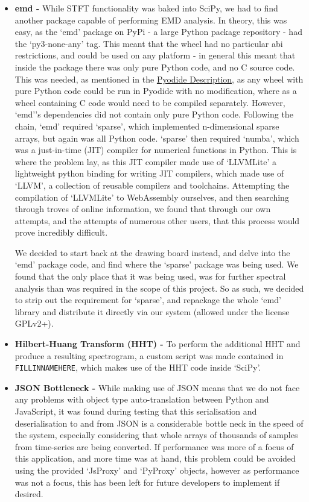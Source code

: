 \begin{itemize}
    \item {\bf emd - } While STFT functionality was baked into SciPy, we had to find another package capable of performing EMD analysis. In theory, this was easy, as the `emd' package on PyPi - a large Python package repository - 
    had the `py3-none-any' tag. This meant that the wheel had no particular abi restrictions, and could be used on any platform - in general this meant that inside the package there was only pure Python code, and no C source code.
    This was needed, as mentioned in the \hyperref[pyodide]{Pyodide Description}, as any wheel with pure Python code could be run in Pyodide with no modification, where as a wheel containing C code would need to be compiled separately.
    However, `emd''s dependencies did not contain only pure Python code. Following the chain, `emd' required `sparse', which implemented n-dimensional sparse arrays, but again was all Python code. `sparse' then required `numba', which was a 
    just-in-time (JIT) compiler for numerical functions in Python. This is where the problem lay, as this JIT compiler made use of `LLVMLite' a lightweight python binding for writing JIT compilers, 
    which made use of `LLVM', a collection of reusable compilers and toolchains. Attempting the compilation of `LLVMLite' to WebAssembly ourselves, and then searching through troves of online information, we found that through our own
    attempts, and the attempts of numerous other users, that this process would prove incredibly difficult.

    We decided to start back at the drawing board instead, and delve into the `emd' package code, and find where the `sparse' package was being used. We found that the only place that it was being used, was for further spectral
    analysis than was required in the scope of this project. So as such, we decided to strip out the requirement for `sparse', and repackage the whole `emd' library and distribute it directly via our
    system (allowed under the license GPLv2+).

    \item {\bf Hilbert-Huang Transform (HHT) - } To perform the additional HHT and produce a resulting spectrogram, a custom script was made contained in \verb|FILLINNAMEHERE|, which makes use of the HHT code inside `SciPy'.

    \item {\bf JSON Bottleneck - } While making use of JSON means that we do not face any problems with object type auto-translation between Python and JavaScript, it was found during testing that this serialisation and deserialisation
    to and from JSON is a considerable bottle neck in the speed of the system, especially considering that whole arrays of thousands of samples from time-series are being converted. If performance was more of a focus of this application,
    and more time was at hand, this problem could be avoided using the provided `JsProxy' and `PyProxy' objects, however as performance was not a focus, this has been left for future developers to implement if desired.


\end{itemize}
